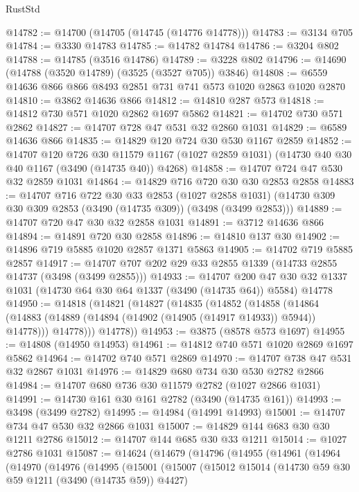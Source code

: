 \begin{lexlean}{RustStd}
\begin{coremodule}
{\begin{coremodule}
{{{{{{{{{{{{{{{{{{{{{{{{{{@14782 := @14700 (@14705 (@14745 (@14776 @14778)))
@14783 := @3134 @705
@14784 := @3330 @14783
@14785 := @14782 @14784
@14786 := @3204 @802
@14788 := @14785 (@3516 @14786)
@14789 := @3228 @802
@14796 := @14690 (@14788 (@3520 @14789) (@3525 (@3527 @705)) @3846)
@14808 := @6559 @14636 @866 @866 @8493 @2851 @731 @741 @573 @1020 @2863 @1020 @2870
@14810 := @3862 @14636 @866
@14812 := @14810 @287 @573
@14818 := @14812 @730 @571 @1020 @2862 @1697 @5862
@14821 := @14702 @730 @571 @2862
@14827 := @14707 @728 @47 @531 @32 @2860 @1031
@14829 := @6589 @14636 @866
@14835 := @14829 @120 @724 @30 @530 @1167 @2859
@14852 := @14707
    @120
    @726
    @30
    @11579
    @1167
    (@1027 @2859 @1031)
    (@14730 @40 @30 @40 @1167 (@3490 (@14735 @40)) @4268)
@14858 := @14707 @724 @47 @530 @32 @2859 @1031
@14864 := @14829 @716 @720 @30 @30 @2853 @2858
@14883 := @14707
    @716
    @722
    @30
    @33
    @2853
    (@1027 @2858 @1031)
    (@14730 @309 @30 @309 @2853 (@3490 (@14735 @309)) (@3498 (@3499 @2853)))
@14889 := @14707 @720 @47 @30 @32 @2858 @1031
@14891 := @3712 @14636 @866
@14894 := @14891 @720 @30 @2858
@14896 := @14810 @137 @30
@14902 := @14896 @719 @5885 @1020 @2857 @1371 @5863
@14905 := @14702 @719 @5885 @2857
@14917 := @14707 @707 @202 @29 @33 @2855 @1339 (@14733 @2855 @14737 (@3498 (@3499 @2855)))
@14933 := @14707
    @200
    @47
    @30
    @32
    @1337
    @1031
    (@14730 @64 @30 @64 @1337 (@3490 (@14735 @64)) @5584)
    @14778
@14950 := @14818
    (@14821
      (@14827
        (@14835
          (@14852
            (@14858
              (@14864 (@14883 (@14889 (@14894 (@14902 (@14905 (@14917 @14933)) @5944)) @14778)))
              @14778)))
        @14778))
@14953 := @3875 (@8578 @573 @1697)
@14955 := @14808 (@14950 @14953)
@14961 := @14812 @740 @571 @1020 @2869 @1697 @5862
@14964 := @14702 @740 @571 @2869
@14970 := @14707 @738 @47 @531 @32 @2867 @1031
@14976 := @14829 @680 @734 @30 @530 @2782 @2866
@14984 := @14707 @680 @736 @30 @11579 @2782 (@1027 @2866 @1031)
@14991 := @14730 @161 @30 @161 @2782 (@3490 (@14735 @161))
@14993 := @3498 (@3499 @2782)
@14995 := @14984 (@14991 @14993)
@15001 := @14707 @734 @47 @530 @32 @2866 @1031
@15007 := @14829 @144 @683 @30 @30 @1211 @2786
@15012 := @14707 @144 @685 @30 @33 @1211
@15014 := @1027 @2786 @1031
@15087 := @14624
    (@14679
      (@14796
        (@14955
          (@14961
            (@14964
              (@14970
                (@14976
                  (@14995
                    (@15001
                      (@15007
                        (@15012
                          @15014
                          (@14730 @59 @30 @59 @1211 (@3490 (@14735 @59)) @4427)
}}}}}}}}}}}}}}}}}}}}}}}}}}
\end{coremodule}}
\end{coremodule}
\end{lexlean}
